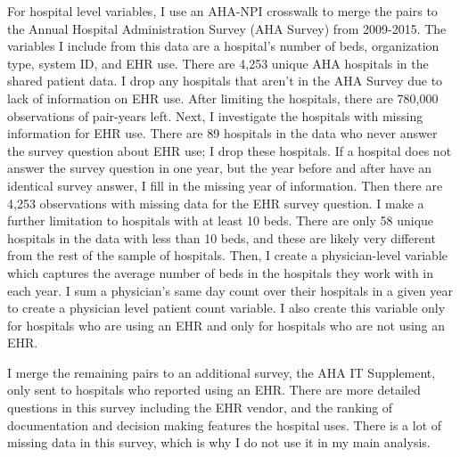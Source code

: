 \documentclass[11pt]{article}
\begin{document}
For hospital level variables, I use an AHA-NPI crosswalk to merge the pairs to the Annual Hospital Administration Survey (AHA Survey) from 2009-2015. The variables I include from this data are a hospital's number of beds, organization type, system ID, and EHR use. There are 4,253 unique AHA hospitals in the shared patient data. I drop any hospitals that aren't in the AHA Survey due to lack of information on EHR use. After limiting the hospitals, there are 780,000 observations of pair-years left. Next, I investigate the hospitals with missing information for EHR use. There are 89 hospitals in the data who never answer the survey question about EHR use; I drop these hospitals. If a hospital does not answer the survey question in one year, but the year before and after have an identical survey answer, I fill in the missing year of information. Then there are 4,253 observations with missing data for the EHR survey question. I make a further limitation to hospitals with at least 10 beds. There are only 58 unique hospitals in the data with less than 10 beds, and these are likely very different from the rest of the sample of hospitals. Then, I create a physician-level variable which captures the average number of beds in the hospitals they work with in each year. I sum a physician's same day count over their hospitals in a given year to create a physician level patient count variable. I also create this variable only for hospitals who are using an EHR and only for hospitals who are not using an EHR.

I merge the remaining pairs to an additional survey, the AHA IT Supplement, only sent to hospitals who reported using an EHR. There are more detailed questions in this survey including the EHR vendor, and the ranking of documentation and decision making features the hospital uses. There is a lot of missing data in this survey, which is why I do not use it in my main analysis. 
\end{document}
